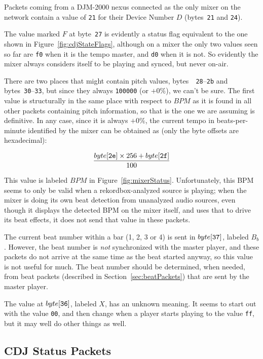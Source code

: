 \documentclass[11pt]{article}
\begin{document}
Packets coming from a DJM-2000 nexus connected as the only mixer on
the network contain a value of {\tt 21} for their Device Number $D$
(bytes~{\tt 21} and {\tt 24}).

The value marked $F$ at byte~{\tt 27} is evidently a status flag
equivalent to the one shown in Figure~\ref{fig:cdjStateFlags},
although on a mixer the only two values seen so far are {\tt f0} when
it is the tempo master, and {\tt d0} when it is not. So evidently the
mixer always considers itself to be playing and synced, but never
on-air.

There are two places that might contain pitch values, bytes~{\tt
  28}--{\tt 2b} and bytes~{\tt 30}--{\tt 33}, but since they always
{\tt 100000} (or $+0\%$), we can't be sure. The first value is
structurally in the same place with respect to $BPM$ as it is found in
all other packets containing pitch information, so that is the one we
are assuming is definitive. In any case, since it is always $+0\%$,
the current tempo in beats-per-minute identified by the mixer can be
obtained as (only the byte offsets are hexadecimal):

\[ \frac{byte[{\tt 2e}] \times 256 + byte[{\tt 2f}]}{100} \]

This value is labeled $BPM$ in Figure~\ref{fig:mixerStatus}.
Unfortunately, this BPM seems to only be valid when a
rekordbox-analyzed source is playing; when the mixer is doing its own
beat detection from unanalyzed audio sources, even though it displays
the detected BPM on the mixer itself, and uses that to drive its beat
effects, it does not send that value in these packets.

The current beat number within a bar (1, 2, 3 or 4) is sent in
$byte[{\tt 37}]$, labeled $B_b$. However, the beat number is
\emph{not} synchronized with the master player, and these packets do
not arrive at the same time as the beat started anyway, so this value
is not useful for much. The beat number should be determined, when
needed, from beat packets (described in Section~\ref{sec:beatPackets})
that are sent by the master player.

The value at $byte[{\tt 36}]$, labeled $X$, has an unknown meaning. It
seems to start out with the value {\tt 00}, and then change when a
player starts playing to the value {\tt ff}, but it may well do other
things as well.

\subsection{CDJ Status Packets}
\end{document}
